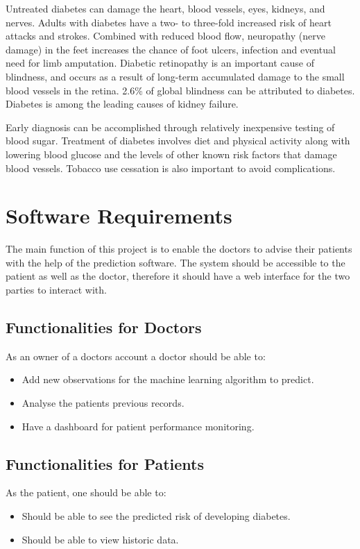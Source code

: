 \documentclass[12pt]{article}
\begin{document}
Untreated diabetes can damage the heart, blood vessels, eyes, kidneys, and nerves. Adults with diabetes have a two- to three-fold increased risk of heart attacks and strokes. Combined with reduced blood flow, neuropathy (nerve damage) in the feet increases the chance of foot ulcers, infection and eventual need for limb amputation. Diabetic retinopathy is an important cause of blindness, and occurs as a result of long-term accumulated damage to the small blood vessels in the retina. 2.6\% of global blindness can be attributed to diabetes. Diabetes is among the leading causes of kidney failure.

Early diagnosis can be accomplished through relatively inexpensive testing of blood sugar. Treatment of diabetes involves diet and physical activity along with lowering blood glucose and the levels of other known risk factors that damage blood vessels. Tobacco use cessation is also important to avoid complications. 

\newpage
\section{Software Requirements}
The main function of this project is to enable the doctors to advise their patients with the help of the prediction software. The system should be accessible to the patient as well as the doctor, therefore it should have a web interface for the two parties to interact with.

\subsection{Functionalities for Doctors}
As an owner of a doctors account a doctor should be able to:
\begin{itemize}
\item Add new observations for the machine learning algorithm to predict.
\item Analyse the patients previous records.
\item Have a dashboard for patient performance monitoring.
\end{itemize}

\subsection{Functionalities for Patients}
As the patient, one should be able to:
\begin{itemize}
\item Should be able to see the predicted risk of developing diabetes.
\item Should be able to view historic data.
\end{itemize}
\end{document}
